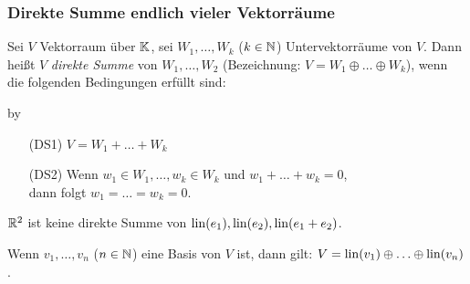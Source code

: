 \subsubsection{Direkte Summe endlich vieler Vektorräume}

Sei $ V $ Vektorraum über $ \mathbb K $, sei $ W_1, \ldots, W_k $ ($ k \in \mathbb N $) Untervektorräume von $ V $. Dann heißt $ V $ \emph{direkte Summe} von $ W_1, \ldots, W_2 $ (Bezeichnung: $ V = W_1 \oplus \ldots \oplus W_k $), wenn die folgenden Bedingungen erfüllt sind:

\advance\myindent by \the{}

\begin{itemize}[leftmargin=\myindent]
	\item[(DS1)]
		$ V = W_1 + \ldots + W_k $
	\item[(DS2)]
		Wenn $ w_1 \in W_1, \ldots, w_k \in W_k $ und $ w_1 + \ldots + w_k = 0 $,\\ dann folgt $ w_1 = \ldots = w_k = 0 $.
\end{itemize}

\begin{bsp}
	$ \mathbb R^2 $ ist keine direkte Summe von $ \operatorname{lin}(e_1), \operatorname{lin}(e_2), \operatorname{lin}(e_1+e_2) $.
\end{bsp}

\begin{bsp}
	Wenn $ v_1, \ldots, v_n $ ($ n \in \mathbb N $) eine Basis von $ V $ ist, dann gilt: $ V = \operatorname{lin}(v_1) \oplus \ldots \oplus \operatorname{lin}(v_n) $.
\end{bsp}


